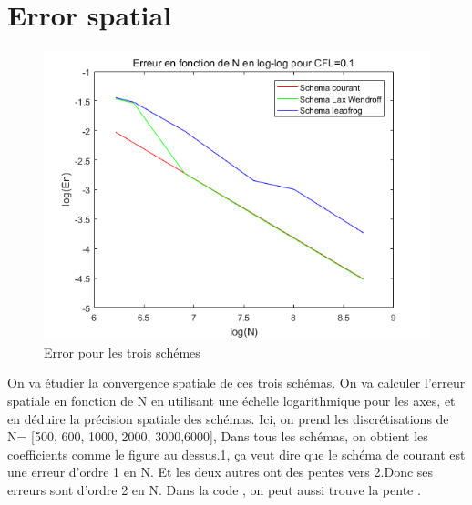 \documentclass[a4paper,10pt]{report} %
\begin{document}
\section{Error spatial }
\begin{figure}[h]
\begin{center}
\includegraphics[width=1.0\textwidth]{FIG/figure5.png}
\end{center}
\caption{Error pour les trois schémes }
\label{figure5}
\end{figure}


On va étudier la convergence spatiale de ces trois schémas. On va calculer l’erreur spatiale en fonction de N en utilisant une échelle logarithmique pour les axes, et en déduire la précision spatiale des schémas.
Ici, on prend les discrétisations de N= [500, 600, 1000, 2000, 3000,6000], 
Dans  tous les schémas, on obtient les coefficients  comme le figure au dessus.1, ça veut dire que le schéma de courant est une erreur d’ordre 1 en N. Et les deux autres ont des pentes vers 2.Donc ses erreurs sont d’ordre 2 en N. Dans la code , on peut aussi trouve la pente .
\end{document}
